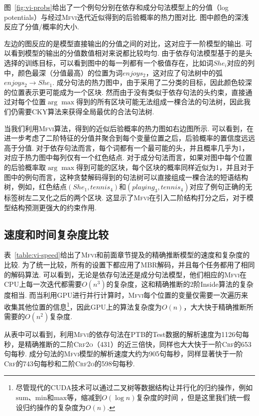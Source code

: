 图~\ref{fig:vi-probs}给出了一个例句分别在依存和成分句法模型上的分值（log potentials）与经过\textsc{Mfvi}迭代近似得到的后验概率的热力图对比.
图中颜色的深浅反应了分值/概率的大小.

左边的图反应的是模型直接输出的分值之间的对比，这对应于一阶模型的输出.
可以看到模型的输出的分值数值相对来说都比较均匀.
由于依存句法模型基于的是头选择的训练目标，可以看到图中的每一列都有一个极值存在，比如词$She_i$对应的列中，颜色最深（分值最高）的位置为词$enjoys_2$，这对应了句法树中的弧$enjoys_2\rightarrow She_1$.
成分句法的热力图中，由于采用了二分类的目标，因此颜色较深的位置表示更可能成为一个区块.
然而由于没有类似于依存句法的头约束，直接通过对每个位置$\arg\max$得到的所有区块可能无法组成一棵合法的句法树，因此我们仍需要CKY算法来获得全局最优的合法句法树.

当我们利用\textsc{Mfvi}算法，得到的近似后验概率的热力图如右边图所示.
可以看到，在进一步考虑了二阶特征的分值并聚合到每个变量位置之后，后验概率的置信度远远高于分值.
对于依存句法而言，每个词都有一个最可能的头，并且概率几乎为1，对应于热力图中每列仅有一个红色结点.
对于成分句法而言，如果对图中每个位置的后验概率取$\arg\max$得到可能的区块，每个区块的概率同样近似为1，并且对于图中的例句而言，这种贪婪解码得到的句法树可以直接组成一棵合法的短语结构树，例如，红色结点$(She_1,tennis_4)$和$(playing_3,tennis_4)$对应了例句正确的无标签树左二叉化之后的两个区块.
这显示了\textsc{Mfvi}在引入二阶结构打分之后，对于模型结构预测更强大的约束作用.


\subsection{速度和时间复杂度比较}
\label{sub@sec:vi-speed}

表~\ref{table:vi-speed}给出了\textsc{Mfvi}和前面章节提及的精确推断模型的速度和复杂度的比较.
为了统一比较，所有的设置下都应用了MBR解码，并且每个任务都用了相同的解码算法.
可以看到，无论是依存句法还是成分句法模型，他们相应的\textsc{Mfvi}在CPU上每一次迭代都需要$O(n^3)$的复杂度，这和精确推断的2阶Inside算法的复杂度相当.
而当利用GPU进行并行计算时，\textsc{Mfvi}每个位置的变量仅需要一次遍历来收集其他位置的信息\footnote{尽管现代的CUDA技术可以通过二叉树等数据结构让并行化的归约操作，例如$\mathrm{sum}$、$\mathrm{min}$和$\mathrm{max}$等，缩减到$O(\log n)$复杂度的时间 \citep{wang-etal-2020-ain}，但是这里我们统一假设归约操作的复杂度为$O(n)$.}，因此GPU上的算法复杂度为$O(n)$，大大快于精确推断所需要的$O(n^2)$复杂度.

从表中可以看到，利用\textsc{Mfvi}的依存句法在PTB的Test数据的解析速度为1126句每秒，是精确推断的二阶\textsc{Crf2o}（431）的近三倍快，同样也大大快于一阶\textsc{Crf}的653句每秒.
成分句法的\textsc{Mfvi}模型的解析速度大约为905句每秒，同样显著快于一阶\textsc{Crf}的743句每秒和二阶\textsc{Crf2o}的598句每秒.

